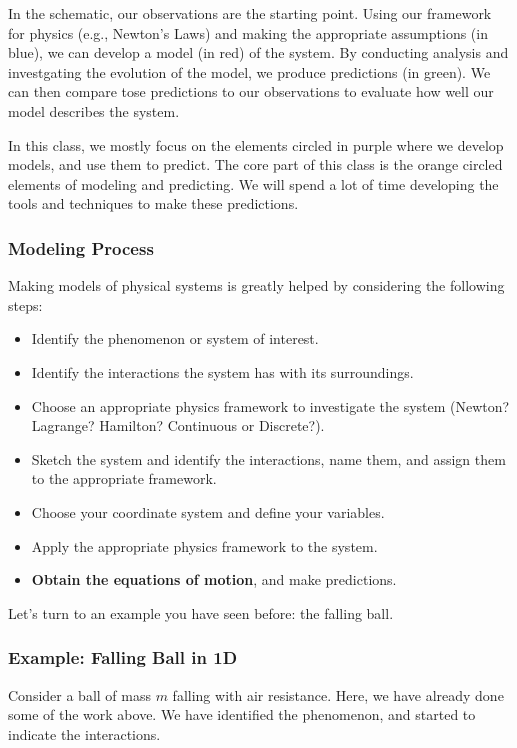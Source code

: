 \documentclass[11pt]{article}
\providecommand{\tightlist}{%
      \setlength{\itemsep}{0pt}\setlength{\parskip}{0pt}}
\begin{document}
In the schematic, our observations are the starting point. Using our
framework for physics (e.g., Newton's Laws) and making the appropriate
assumptions (in blue), we can develop a model (in red) of the system. By
conducting analysis and investgating the evolution of the model, we
produce predictions (in green). We can then compare tose predictions to
our observations to evaluate how well our model describes the system.

In this class, we mostly focus on the elements circled in purple where
we develop models, and use them to predict. The core part of this class
is the orange circled elements of modeling and predicting. We will spend
a lot of time developing the tools and techniques to make these
predictions.

\subsubsection{Modeling Process}\label{modeling-process}

Making models of physical systems is greatly helped by considering the
following steps:

\begin{itemize}
\tightlist
\item
  Identify the phenomenon or system of interest.
\item
  Identify the interactions the system has with its surroundings.
\item
  Choose an appropriate physics framework to investigate the system
  (Newton? Lagrange? Hamilton? Continuous or Discrete?).
\item
  Sketch the system and identify the interactions, name them, and assign
  them to the appropriate framework.
\item
  Choose your coordinate system and define your variables.
\item
  Apply the appropriate physics framework to the system.
\item
  \textbf{Obtain the equations of motion}, and make predictions.
\end{itemize}

Let's turn to an example you have seen before: the falling ball.

    \subsubsection{Example: Falling Ball in
1D}\label{example-falling-ball-in-1d}

Consider a ball of mass \(m\) falling with air resistance. Here, we have
already done some of the work above. We have identified the phenomenon,
and started to indicate the interactions.
\end{document}
